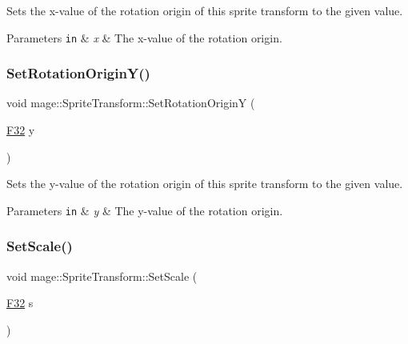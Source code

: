 Sets the x-\/value of the rotation origin of this sprite transform to the given value.


\begin{DoxyParams}[1]{Parameters}
\mbox{\tt in}  & {\em x} & The x-\/value of the rotation origin. \\
\hline
\end{DoxyParams}
\mbox{\label{classmage_1_1_sprite_transform_a8ccfaf7282419ed636cc97f911472604}} 
\subsubsection{\texorpdfstring{Set\+Rotation\+Origin\+Y()}{SetRotationOriginY()}}
{\footnotesize\ttfamily void mage\+::\+Sprite\+Transform\+::\+Set\+Rotation\+OriginY (\begin{DoxyParamCaption}\item[{\mbox{\hyperlink{namespacemage_aa97e833b45f06d60a0a9c4fc22ae02c0}{F32}}}]{y }\end{DoxyParamCaption})\hspace{0.3cm}{\ttfamily [noexcept]}}

Sets the y-\/value of the rotation origin of this sprite transform to the given value.


\begin{DoxyParams}[1]{Parameters}
\mbox{\tt in}  & {\em y} & The y-\/value of the rotation origin. \\
\hline
\end{DoxyParams}
\mbox{\label{classmage_1_1_sprite_transform_ad11fab7a12f6d1ce79eab12e16adab93}} 
\subsubsection{\texorpdfstring{Set\+Scale()}{SetScale()}\hspace{0.1cm}{\footnotesize\ttfamily [1/4]}}
{\footnotesize\ttfamily void mage\+::\+Sprite\+Transform\+::\+Set\+Scale (\begin{DoxyParamCaption}\item[{\mbox{\hyperlink{namespacemage_aa97e833b45f06d60a0a9c4fc22ae02c0}{F32}}}]{s }\end{DoxyParamCaption})\hspace{0.3cm}{\ttfamily [noexcept]}}


